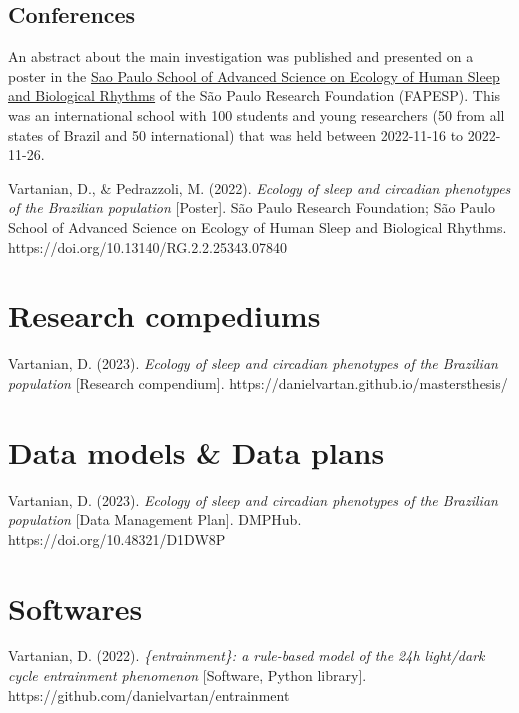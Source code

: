 \documentclass[
  12pt,
  a4paper,
  oneside]{tesesusp}
\begin{document}
\hypertarget{conferences}{%
\subsection{Conferences}\label{conferences}}

An abstract about the main investigation was published and presented on
a poster in the
\href{https://espca.fapesp.br/school/sao_paulo_school_of_advanced_science_on_ecology_of_human_sleep_and_biological_rhythms/101/}{Sao
Paulo School of Advanced Science on Ecology of Human Sleep and
Biological Rhythms} of the São Paulo Research Foundation (FAPESP). This
was an international school with 100 students and young researchers (50
from all states of Brazil and 50 international) that was held between
2022-11-16 to 2022-11-26.

Vartanian, D., \& Pedrazzoli, M. (2022). \emph{Ecology of sleep and
circadian phenotypes of the Brazilian population} {[}Poster{]}. São
Paulo Research Foundation; São Paulo School of Advanced Science on
Ecology of Human Sleep and Biological Rhythms.
https://doi.org/10.13140/RG.2.2.25343.07840

\hypertarget{research-compediums}{%
\section{Research compediums}\label{research-compediums}}

Vartanian, D. (2023). \emph{Ecology of sleep and circadian phenotypes of
the Brazilian population} {[}Research compendium{]}.
https://danielvartan.github.io/mastersthesis/

\hypertarget{data-models-data-plans}{%
\section{Data models \& Data plans}\label{data-models-data-plans}}

Vartanian, D. (2023). \emph{Ecology of sleep and circadian phenotypes of
the Brazilian population} {[}Data Management Plan{]}. DMPHub.
https://doi.org/10.48321/D1DW8P

\hypertarget{softwares}{%
\section{Softwares}\label{softwares}}

Vartanian, D. (2022). \emph{\{entrainment\}: a rule-based model of the
24h light/dark cycle entrainment phenomenon} {[}Software, Python
library{]}. https://github.com/danielvartan/entrainment
\end{document}

